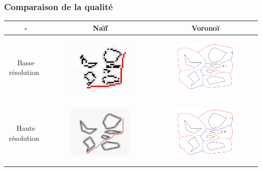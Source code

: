 \begin{frame}
\frametitle{Comparaison de la qualité}
\begin{table}
\begin{tabular}{|c||c|c|}
    \hline
     - & Naïf & Voronoï \\
    \hline\hline
    \begin{sideways}
    Basse résolution~
    \end{sideways}
    &
    \begin{figure}
        \centering
        \includegraphics[width=0.3\linewidth]{assets/NaLow.png}
    \end{figure}
    &
    \begin{figure}
        \centering
        \includegraphics[width=0.3\linewidth]{assets/VorLow.png}
    \end{figure} \\
    \hline
    \begin{sideways}
    Haute résolution~
    \end{sideways}
    &
    \begin{figure}
        \centering
        \includegraphics[width=0.3\linewidth]{assets/NaHigh.png}
    \end{figure}
    &
    \begin{figure}
        \centering
        \includegraphics[width=0.3\linewidth]{assets/VorHigh.png}
    \end{figure} \\
    \hline
\end{tabular}
\end{table}
\end{frame}